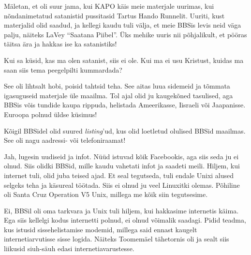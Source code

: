 Mäletan, et oli suur jama, kui KAPO käis meie materjale uurimas, 
kui nõndanimetatud satanistid pussitasid Tartus Hando 
Runnelit. Uuriti, kust materjalid olid saadud, ja kellegi 
kaudu tuli välja, et meie BBSis levis neid väga palju, näiteks LaVey \enquote{Saatana 
Piibel}. Üks mehike uuris nii põhjalikult, 
et pööras täitsa ära ja hakkas ise ka satanistiks!

Kui sa küsid, kas ma olen satanist, siis ei ole. Kui ma ei 
usu Kristust, kuidas ma saan siis tema peegelpilti kummardada?


See oli lihtsalt hobi, poisid tahtsid teha. See aitas luua sidemeid ja tõmmata igasuguseid materjale üle 
maailma. Tol ajal olid ju kaugekõned tasulised, aga BBSis võis tundide kaupa rippuda, helistada 
Ameerikasse, Iisraeli või Jaapanisse. Euroopa polnud üldse küsimus!


Kõigil BBSidel olid suured \emph{listing}'ud, kus olid loetletud 
olulised BBSid maailmas. See oli nagu aadressi- või telefoniraamat! 


Jah, lugesin uudiseid ja infot. Nüüd istuvad kõik Facebookis, aga siis seda ju 
ei olnud. Siis olidki BBSid, mille kaudu vahetati infot ja saadeti meili. Hiljem, kui internet tuli, olid juba teised ajad. Et seal 
tegutseda, tuli endale Unixi alused selgeks teha ja käsureal töötada. Siis ei 
olnud ju veel Linuxitki olemas. Põhiline oli Santa Cruz 
Operation V5 Unix, millega 
me kõik siin tegutsesime.


Ei, BBSil oli oma tarkvara ja Unix tuli hiljem, kui hakkasime internetis 
käima. Ega siis kellelgi kodus 
internetti polnud, ei olnud võimalik saadagi. Pidid teadma, kus istusid sissehelistamise modemid, millega said ennast kaugelt internetiarvutisse 
sisse logida. Näiteks Toomemäel tähetornis oli ja sealt siis 
liikusid siuh-säuh edasi internetiavarustesse.


